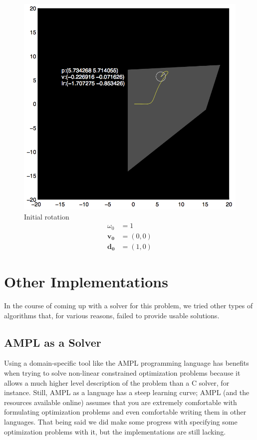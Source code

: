 \documentclass{report}
\begin{document}
\begin{figure}
\begin{minipage}{\linewidth}
\begin{minipage}[t]{0.45\linewidth}
    \includegraphics[width=\linewidth]{fig4.png}
    \captionsetup{singlelinecheck=off}
    \caption[.]{\label{fig:fig4}Initial rotation\begin{align*}
    \omega_0 &= 1 \\
    \mathbf{v_0} &= (0, 0)\\
    \mathbf{d_0} &= (1, 0)
    \end{align*}
    }
\end{minipage}
\end{minipage}
\end{figure}

\section{Other Implementations}
In the course of coming up with a solver for this problem, we tried other
types of algorithms that, for various reasons, failed to provide usable solutions.
\subsection{AMPL as a Solver}
Using a domain-specific tool like the AMPL programming language has benefits
when trying to solve non-linear constrained optimization problems because it
allows a much higher level description of the problem than a C solver, for instance.
Still, AMPL as a language has a steep learning curve; AMPL (and the
resources available online) assumes that you are extremely comfortable with
formulating optimization
problems and even comfortable writing them in other languages. That being said
we did make some progress with specifying some optimization problems with it,
but the implementations are still lacking.
\end{document}
